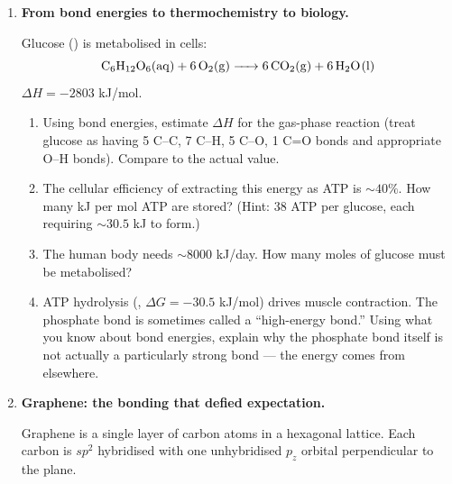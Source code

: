\documentclass[12pt, a4paper]{book}
\begin{document}
\begin{deepbox}
\begin{enumerate}[label=\textbf{D\arabic*.}]

  \item \textbf{From bond energies to thermochemistry to biology.}

    Glucose () is metabolised in cells:
    \[
      \ce{C6H12O6(aq) + 6O2(g) -> 6CO2(g) + 6H2O(l)}
    \]
    $\Delta H = -2803$ kJ/mol.

    \begin{enumerate}[label=(\alph*)]
      \item Using bond energies, estimate $\Delta H$ for
            the gas-phase reaction (treat glucose as
            having 5 C--C, 7 C--H, 5 C--O, 1 C=O bonds
            and appropriate O--H bonds).
            Compare to the actual value.
      \item The cellular efficiency of extracting this energy
            as ATP is $\sim 40\%$.
            How many kJ per mol ATP are stored?
            (Hint: 38 ATP per glucose, each requiring
            $\sim 30.5$ kJ to form.)
      \item The human body needs $\sim 8000$ kJ/day.
            How many moles of glucose must be metabolised?
      \item ATP hydrolysis (,
            $\Delta G = -30.5$ kJ/mol) drives muscle
            contraction. The phosphate bond is sometimes
            called a ``high-energy bond.''
            Using what you know about bond energies,
            explain why the phosphate bond itself is not
            actually a particularly strong bond --- the
            energy comes from elsewhere.
    \end{enumerate}

  \item \textbf{Graphene: the bonding that defied expectation.}

    Graphene is a single layer of carbon atoms in a hexagonal
    lattice. Each carbon is $sp^2$ hybridised with one
    unhybridised $p_z$ orbital perpendicular to the plane.


\end{enumerate}
\end{deepbox}
\end{document}
